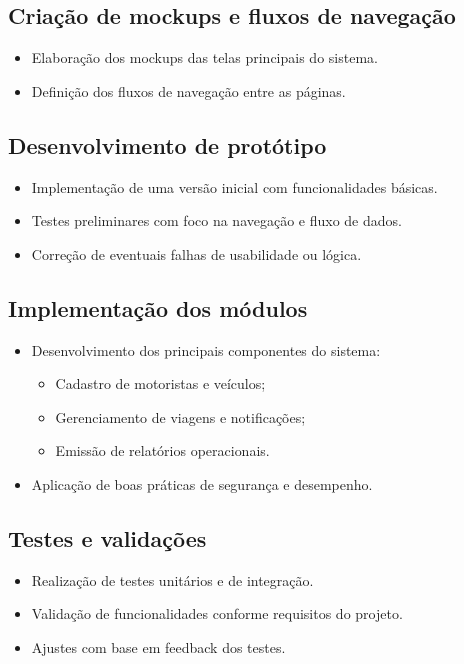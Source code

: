 \documentclass[12pt]{article}
\begin{document}
\subsection{Criação de mockups e fluxos de navegação}
\begin{itemize}
    \item Elaboração dos mockups das telas principais do sistema.
    \item Definição dos fluxos de navegação entre as páginas.
\end{itemize}

\subsection{Desenvolvimento de protótipo}
\begin{itemize}
    \item Implementação de uma versão inicial com funcionalidades básicas.
    \item Testes preliminares com foco na navegação e fluxo de dados.
    \item Correção de eventuais falhas de usabilidade ou lógica.
\end{itemize}

\subsection{Implementação dos módulos}
\begin{itemize}
    \item Desenvolvimento dos principais componentes do sistema:
    \begin{itemize}
        \item Cadastro de motoristas e veículos;
        \item Gerenciamento de viagens e notificações;
        \item Emissão de relatórios operacionais.
    \end{itemize}
    \item Aplicação de boas práticas de segurança e desempenho.
\end{itemize}

\subsection{Testes e validações}
\begin{itemize}
    \item Realização de testes unitários e de integração.
    \item Validação de funcionalidades conforme requisitos do projeto.
    \item Ajustes com base em feedback dos testes.
\end{itemize}
\end{document}
